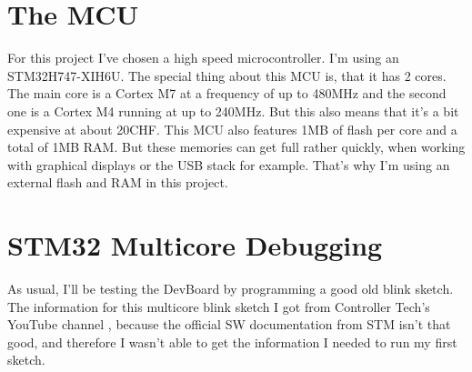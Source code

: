 \section{The MCU}
For this project I've chosen a high speed microcontroller. I'm using an STM32H747-XIH6U. The special thing about this MCU is, that it has 2 cores. The main core is a Cortex M7 at a frequency of up to 480MHz and the second one is a Cortex M4 running at up to 240MHz. But this also means that it's a bit expensive at about 20CHF. This MCU also features 1MB of flash per core and a total of 1MB RAM. But these memories can get full rather quickly, when working with graphical displays or the USB stack for example. That's why I'm using an external flash and RAM in this project.
\\


\section{STM32 Multicore Debugging}
As usual, I'll be testing the DevBoard by programming a good old blink sketch. The information for this multicore blink sketch I got from Controller Tech's YouTube channel \cite{YT_CT_Mutlicore_Debugging}, because the official SW documentation from STM isn't that good, and therefore I wasn't able to get the information I needed to run my first sketch.

